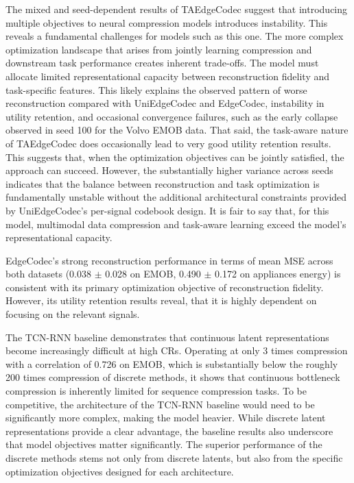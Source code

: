 The mixed and seed-dependent results of TAEdgeCodec suggest that introducing multiple objectives to neural compression models introduces instability. This reveals a fundamental challenges for models such as this one. The more complex optimization landscape that arises from jointly learning compression and downstream task performance creates inherent trade-offs. The model must allocate limited representational capacity between reconstruction fidelity and task-specific features. This likely explains the observed pattern of worse reconstruction compared with UniEdgeCodec and EdgeCodec, instability in utility retention, and occasional convergence failures, such as the early collapse observed in seed 100 for the Volvo EMOB data. That said, the task-aware nature of TAEdgeCodec does occasionally lead to very good utility retention results. This suggests that, when the optimization objectives can be jointly satisfied, the approach can succeed. However, the substantially higher variance across seeds indicates that the balance between reconstruction and task optimization is fundamentally unstable without the additional architectural constraints provided by UniEdgeCodec's per-signal codebook design. It is fair to say that, for this model, multimodal data compression and task-aware learning exceed the model's representational capacity.

EdgeCodec's strong reconstruction performance in terms of mean MSE across both datasets (0.038 $\pm$ 0.028 on EMOB, 0.490 $\pm$ 0.172 on appliances energy) is consistent with its primary optimization objective of reconstruction fidelity. However, its utility retention results reveal, that it is highly dependent on focusing on the relevant signals.

The TCN-RNN baseline demonstrates that continuous latent representations become increasingly difficult at high CRs. Operating at only 3 times compression with a correlation of 0.726 on EMOB, which is substantially below the roughly 200 times compression of discrete methods, it shows that continuous bottleneck compression is inherently limited for sequence compression tasks. To be competitive, the architecture of the TCN-RNN baseline would need to be significantly more complex, making the model heavier. While discrete latent representations provide a clear advantage, the baseline results also underscore that model objectives matter significantly. The superior performance of the discrete methods stems not only from discrete latents, but also from the specific optimization objectives designed for each architecture.

